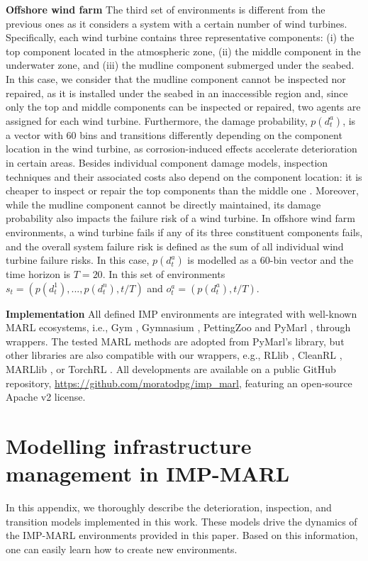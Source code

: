 \textbf{Offshore wind farm}
The third set of environments is different from the previous ones as it considers a system with a certain number of wind turbines.
Specifically, each wind turbine contains three representative components: (i) the top component located in the atmospheric zone, (ii) the middle component in the underwater zone, and (iii) the mudline component submerged under the seabed.
In this case, we consider that the mudline component cannot be inspected nor repaired, as it is installed under the seabed in an inaccessible region and, since only the top and middle components can be inspected or repaired, two agents are assigned for each wind turbine.
Furthermore, the damage probability, $p(d^a_t)$, is a vector with 60 bins and transitions differently depending on the component location in the wind turbine, as corrosion-induced effects accelerate deterioration in certain areas. 
Besides individual component damage models, inspection techniques and their associated costs also depend on the component location: it is cheaper to inspect or repair the top components than the middle one \citep{giro2022inspection}.
Moreover, while the mudline component cannot be directly maintained, its damage probability also impacts the failure risk of a wind turbine.
In offshore wind farm environments, a wind turbine fails if any of its three constituent components fails, and the overall system failure risk is defined as the sum of all individual wind turbine failure risks. In this case, $p(d^a_t)$ is modelled as a 60-bin vector and the time horizon is $T=20$.
In this set of environments $s_t = (p(d^1_t),..., p(d^n_t), t/T)$ and $o^a_t=(p(d^a_t), t/T)$.

\textbf{Implementation}
All defined IMP environments are integrated with well-known MARL ecosystems, i.e., Gym \citep{openaigym}, Gymnasium \citep{towers_gymnasium_2023}, PettingZoo \citep{terry2021pettingzoo} and PyMarl \citep{samvelyan2019starcraft}, through wrappers.
The tested MARL methods are adopted from PyMarl's library, but other libraries are also compatible with our wrappers, e.g., RLlib \citep{liang2018rllib}, CleanRL \citep{huang2022cleanrl}, MARLlib \citep{hu2022marllib}, or TorchRL \citep{bou2023torchrl}.
All developments are available on a public GitHub repository, \url{https://github.com/moratodpg/imp\_marl}, featuring an open-source Apache v2 license.


\section{Modelling infrastructure management in IMP-MARL}
\label{App:pomdpModels}
In this appendix, we thoroughly describe the deterioration, inspection, and transition models implemented in this work. 
These models drive the dynamics of the IMP-MARL environments provided in this paper.
Based on this information, one can easily learn how to create new environments.

